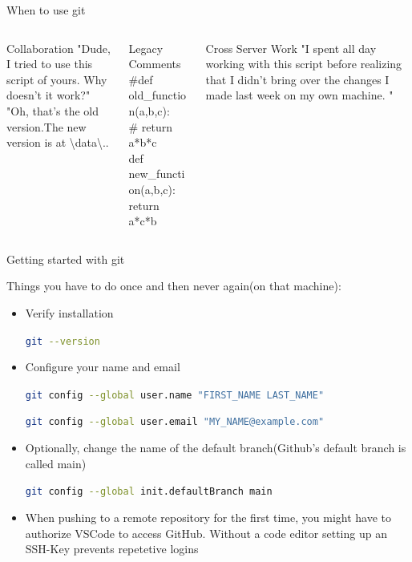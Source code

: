 \documentclass[en]{sdqbeamer}
\begin{document}
\begin{frame}{When to use git}
\begin{columns}
\begin{column}{0.3\textwidth}
\begin{exampleblock}{Collaboration}
"Dude, I tried to use this script of yours. Why doesn't it work?"\\
"Oh, that's the old version.The new version is at \textbackslash data\textbackslash ..
\end{exampleblock}
\end{column}

\begin{column}{0.3\textwidth}
\begin{exampleblock}{Legacy Comments}
\#def old\_function(a,b,c):\\
\#   return a*b*c\\
def new\_function(a,b,c):\\
    return a*c*b\\
\end{exampleblock}
\end{column}

\begin{column}{0.3\textwidth}
\begin{exampleblock}{Cross Server Work}
"I spent all day working with this script before realizing that I didn't bring over the changes I made last week on my own machine. "
\end{exampleblock}
\end{column}
\end{columns}
\end{frame}

\begin{frame}{Getting started with git}

Things you have to do once and then never again(on that machine):
\begin{itemize}
    \item Verify installation

        \lstinline[language=bash]{git --version}

    \item Configure your name and email

        \lstinline[language=bash]{git config --global user.name "FIRST_NAME LAST_NAME"}

        \lstinline[language=bash]{git config --global user.email "MY_NAME@example.com"}

    \item Optionally, change the name of the default branch(Github's default branch is called main)
    
        \lstinline[language=bash]{git config --global init.defaultBranch main}

    \item When pushing to a remote repository for the first time, you might have to authorize VSCode to access GitHub. Without a code editor setting up an SSH-Key prevents repetetive logins
        
\end{itemize}
    
\end{frame}
\end{document}
